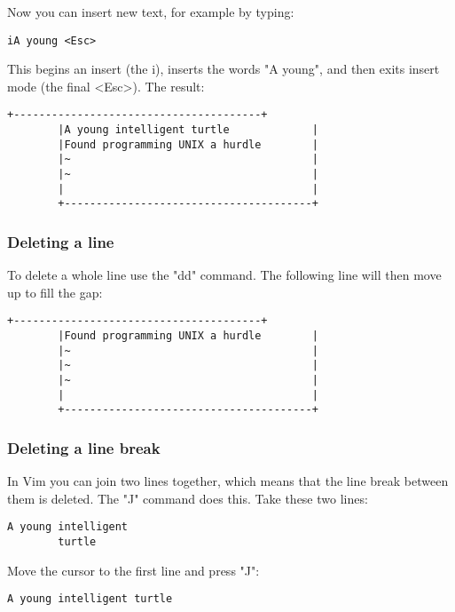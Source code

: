 Now you can insert new text, for example by typing:

 \begin{Verbatim}[samepage=true]
 iA young <Esc>
 \end{Verbatim}

This begins an insert (the i), inserts the words "A young", and then exits insert mode (the final <Esc>).
 The result: 
		\begin{Verbatim}[samepage=true]
		+---------------------------------------+
		|A young intelligent turtle             |
		|Found programming UNIX a hurdle        |
		|~                                      |
		|~                                      |
		|                                       |
		+---------------------------------------+
		\end{Verbatim}

\subsubsection{Deleting a line}

To delete a whole line use the "dd" command.
The following line will then move up to fill the gap: 

		\begin{Verbatim}[samepage=true]
		+---------------------------------------+
		|Found programming UNIX a hurdle        |
		|~                                      |
		|~                                      |
		|~                                      |
		|                                       |
		+---------------------------------------+
		\end{Verbatim}

\subsubsection{Deleting a line break}

In Vim you can join two lines together, which means that the line break between them is deleted.
The "J" command does this.
Take these two lines: 

		\begin{Verbatim}[samepage=true]
		A young intelligent 
		turtle 
		\end{Verbatim}

Move the cursor to the first line and press "J":

		\begin{Verbatim}[samepage=true]
		A young intelligent turtle 
		\end{Verbatim}


